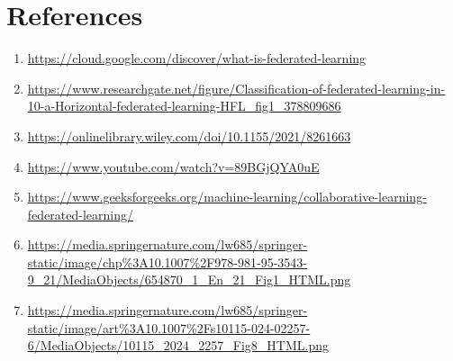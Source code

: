 \documentclass[12pt]{article}
\begin{document}
\section{References}
\label{sec:references}

\begin{enumerate}
    \item \url{https://cloud.google.com/discover/what-is-federated-learning}
    \item \url{https://www.researchgate.net/figure/Classification-of-federated-learning-in-10-a-Horizontal-federated-learning-HFL_fig1_378809686}
    \item \url{https://onlinelibrary.wiley.com/doi/10.1155/2021/8261663}
    \item \url{https://www.youtube.com/watch?v=89BGjQYA0uE}
    \item \url{https://www.geeksforgeeks.org/machine-learning/collaborative-learning-federated-learning/}
    \item \url{https://media.springernature.com/lw685/springer-static/image/chp\%3A10.1007\%2F978-981-95-3543-9_21/MediaObjects/654870_1_En_21_Fig1_HTML.png}
    \item \url{https://media.springernature.com/lw685/springer-static/image/art\%3A10.1007\%2Fs10115-024-02257-6/MediaObjects/10115_2024_2257_Fig8_HTML.png}
\end{enumerate}
\end{document}
